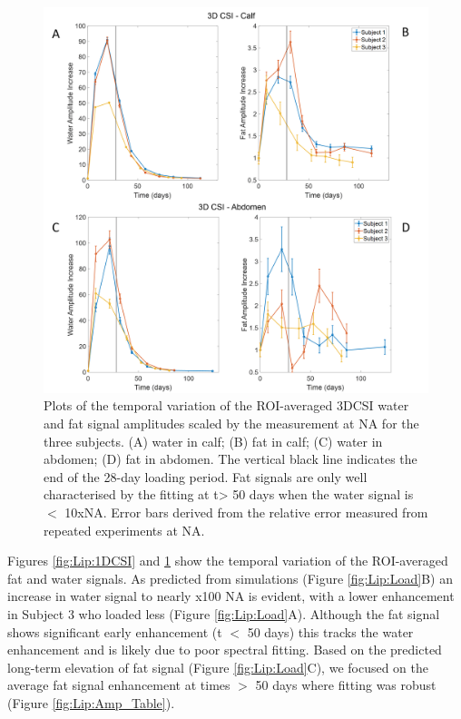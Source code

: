\documentclass[class=article, crop=false]{standalone}
\begin{document}
\begin{figure}
    \centering
    \includegraphics[width=1\textwidth]{Figures/Lipid/3DCSI_Amplitude.png}
    \caption{Plots of the temporal variation of the ROI-averaged 3DCSI water and fat signal amplitudes scaled by the measurement at NA for the three subjects. (A) water in calf; (B) fat in calf; (C) water in abdomen; (D) fat in abdomen. The vertical black line indicates the end of the 28-day loading period. Fat signals are only well characterised by the fitting at t> 50 days when the water signal is $<$ 10xNA.  Error bars derived from the relative error measured from repeated experiments at NA.}
    \label{fig:Lip:3DCSI}
\end{figure}

Figures \ref{fig:Lip:1DCSI} and \ref{fig:Lip:3DCSI} show the temporal variation of the ROI-averaged fat and water signals. As predicted from simulations (Figure \ref{fig:Lip:Load}B) an increase in water signal to nearly x100 NA is evident, with a lower enhancement in Subject 3 who loaded less (Figure \ref{fig:Lip:Load}A). Although the fat signal shows significant early enhancement (t $<$ 50 days) this tracks the water enhancement and is likely due to poor spectral fitting. Based on the predicted long-term elevation of fat signal (Figure \ref{fig:Lip:Load}C), we focused on the average fat signal enhancement at times $>$ 50 days where fitting was robust (Figure \ref{fig:Lip:Amp_Table}). 
\end{document}
